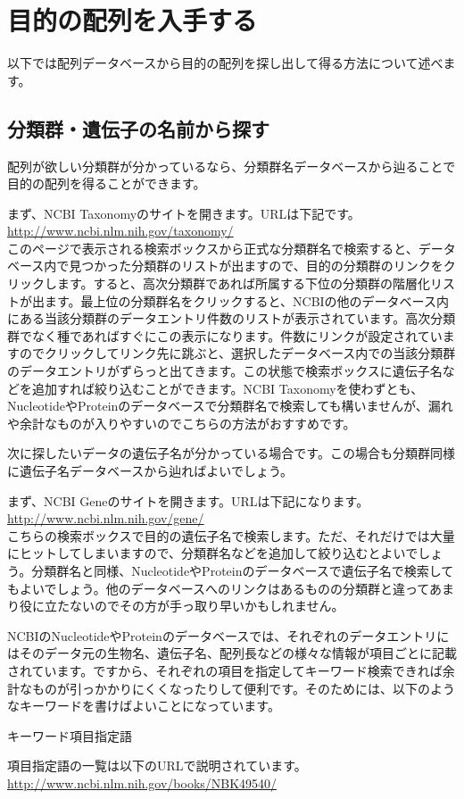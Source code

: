 \documentclass[titlepage,10pt,a4paper]{jsbook}
\newenvironment{pre}{\begin{leftbar}\raggedright\ttfamily\footnotesize\setlength{\baselineskip}{1.4em}}{\end{leftbar}\vspace{-1em}}
\begin{document}
\section{目的の配列を入手する}

以下では配列データベースから目的の配列を探し出して得る方法について述べます。

\subsection{分類群・遺伝子の名前から探す}

配列が欲しい分類群が分かっているなら、分類群名データベースから辿ることで目的の配列を得ることができます。

まず、NCBI Taxonomyのサイトを開きます。URLは下記です。\\
\href{http://www.ncbi.nlm.nih.gov/taxonomy/}{http://www.ncbi.nlm.nih.gov/taxonomy/}\\
このページで表示される検索ボックスから正式な分類群名で検索すると、データベース内で見つかった分類群のリストが出ますので、目的の分類群のリンクをクリックします。すると、高次分類群であれば所属する下位の分類群の階層化リストが出ます。最上位の分類群名をクリックすると、NCBIの他のデータベース内にある当該分類群のデータエントリ件数のリストが表示されています。高次分類群でなく種であればすぐにこの表示になります。件数にリンクが設定されていますのでクリックしてリンク先に跳ぶと、選択したデータベース内での当該分類群のデータエントリがずらっと出てきます。この状態で検索ボックスに遺伝子名などを追加すれば絞り込むことができます。NCBI Taxonomyを使わずとも、NucleotideやProteinのデータベースで分類群名で検索しても構いませんが、漏れや余計なものが入りやすいのでこちらの方法がおすすめです。

次に探したいデータの遺伝子名が分かっている場合です。この場合も分類群同様に遺伝子名データベースから辿ればよいでしょう。

まず、NCBI Geneのサイトを開きます。URLは下記になります。\\
\href{http://www.ncbi.nlm.nih.gov/gene/}{http://www.ncbi.nlm.nih.gov/gene/}\\
こちらの検索ボックスで目的の遺伝子名で検索します。ただ、それだけでは大量にヒットしてしまいますので、分類群名などを追加して絞り込むとよいでしょう。分類群名と同様、NucleotideやProteinのデータベースで遺伝子名で検索してもよいでしょう。他のデータベースへのリンクはあるものの分類群と違ってあまり役に立たないのでその方が手っ取り早いかもしれません。

NCBIのNucleotideやProteinのデータベースでは、それぞれのデータエントリにはそのデータ元の生物名、遺伝子名、配列長などの様々な情報が項目ごとに記載されています。ですから、それぞれの項目を指定してキーワード検索できれば余計なものが引っかかりにくくなったりして便利です。そのためには、以下のようなキーワードを書けばよいことになっています。
\begin{pre}
キーワード{\lbrack}項目指定語{\rbrack}
\end{pre}
項目指定語の一覧は以下のURLで説明されています。\\
\href{http://www.ncbi.nlm.nih.gov/books/NBK49540/}{http://www.ncbi.nlm.nih.gov/books/NBK49540/}
\end{document}
